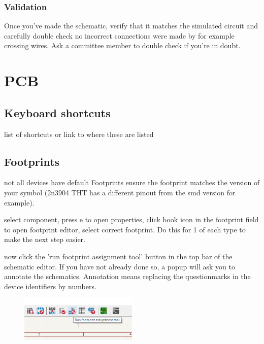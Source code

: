 \documentclass[12pt]{article}
\begin{document}
\subsubsection{Validation}
Once you've made the schematic, verify that it matches the simulated circuit and carefully double check no incorrect connections were made by for example crossing wires. 
Ask a committee member to double check if you're in doubt.


\section{PCB}

\subsection{Keyboard shortcuts}
list of shortcuts or link to where these are listed


\subsection{Footprints}
not all devices have default Footprints
ensure the footprint matches the version of your symbol (2n3904 THT has a different pinout from the smd version for example).

select component, press e to open properties, click book icon in the footprint field to open footprint editor, select correct footprint. Do this for 1 of each type to make the next step easier.

now click the 'run footprint assignment tool' button in the top bar of the schematic editor. If you have not already done so, a popup will ask you to annotate the schematics. Annotation means replacing the questionmarks in the device identifiers by numbers.

\begin{figure}[h]
	\centering
	\includegraphics[width=0.5\textwidth]{../images/run_footprint_assignment_tool.png}
	\caption{}
	\label{fig:run_footprint_assignment_tool}
\end{figure}
\end{document}
